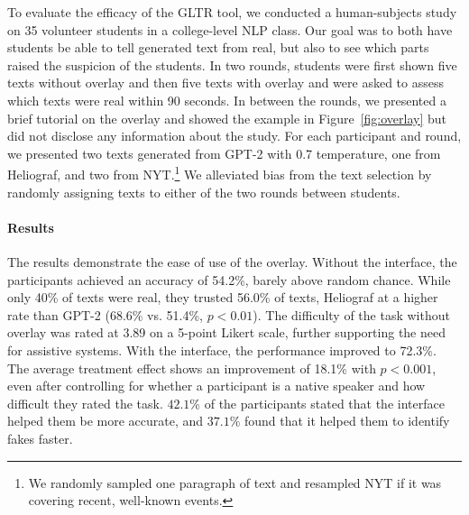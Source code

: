 \documentclass[11pt,a4paper]{article}
\begin{document}
To evaluate the efficacy of the GLTR tool, we conducted a human-subjects study on 35 volunteer students in a college-level NLP class. Our goal was to both have
students be able to tell generated text from real, but also to see which parts raised the suspicion of the students. In two rounds, students were first shown five texts without overlay and then five texts with overlay and were asked to assess which texts were real within 90 seconds. In between the rounds, we presented a brief tutorial on the overlay and showed the example in Figure~\ref{fig:overlay} but did not disclose any information about the study. For each participant and round, we presented two texts generated from GPT-2 with 0.7 temperature, one from Heliograf, and two from NYT.\footnote{We randomly sampled one paragraph of text and resampled NYT if it was covering recent, well-known events.}
We alleviated bias from the text selection by randomly assigning texts to either of the two rounds between students.

\paragraph{Results}

The results demonstrate the ease of use of the overlay. Without the interface, the participants achieved an accuracy of 54.2\%, barely above random chance. While only 40\% of texts were real, they trusted 56.0\% of texts, Heliograf at a higher rate than GPT-2 (68.6\% vs. 51.4\%, $p<0.01$). The difficulty of the task without overlay was rated at 3.89 on a 5-point Likert scale, further supporting the need for assistive systems.
With the interface, the performance improved to 72.3\%. The average treatment effect shows an improvement of 18.1\% with $p<0.001$, even after controlling for whether a participant is a native speaker and how difficult they rated the task. $42.1$\% of the participants stated that the interface helped them be more accurate, and $37.1$\% found that it helped them to identify fakes faster.
\end{document}
